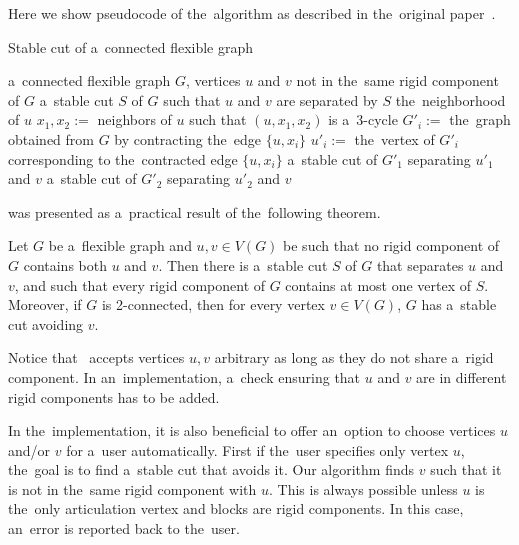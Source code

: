 Here we show pseudocode of the~algorithm as described
in the~original paper~\cite{stable_cuts_legersky}.
%
\begin{algorithm}[ht]
	\caption{Stable cut of a~connected flexible graph}%
	\label{alg:stable_cut_flexible}%
	\begin{algorithmic}[1]
		\Require{} a~connected flexible graph $G$, vertices $u$ and $v$ not in the~same rigid component of $G$
		\Ensure{} a~stable cut $S$ of $G$ such that $u$ and $v$ are separated by $S$
		\State\Return{} the~neighborhood of $u$
		\Else{}
		\State{} $x_1,x_2 :={}$ neighbors of $u$ such that $(u,x_1,x_2)$  is a~$3$-cycle
		\State{} $G'_i :={}$ the~graph obtained from $G$ by contracting the~edge $\{u, x_i\}$
		\State{} $u'_i :={}$ the~vertex of $G'_i$ corresponding to the~contracted edge $\{u, x_i\}$
		\EndFor{}
		\State\Return{} a~stable cut of $G'_1$ separating $u'_1$ and $v$
		\Else{}
		\State\Return{} a~stable cut of $G'_2$ separating $u'_2$ and $v$
		\EndIf{}
		\EndIf{}
	\end{algorithmic}
\end{algorithm}
%

was presented as a~practical result of the~following theorem.
%
\begin{theorem}
	Let \( G \) be a~flexible graph and \( u, v \in V (G) \) be such that no rigid component of \( G \)
	contains both \( u \) and \( v \). Then there is a~stable cut \( S \) of \( G \) that separates \( u \) and \( v \), and such that
	every rigid component of \( G \) contains at most one vertex of \( S \). Moreover, if \( G \) is 2-connected,
	then for every vertex \( v \in V(G) \), \( G \) has a~stable cut avoiding \( v \).
\end{theorem}
%

Notice that~
accepts vertices \( u, v \) arbitrary as long as they do not share a~rigid component.
In an~implementation, a~check ensuring that \( u \) and \( v \)
are in different rigid components has to be added.

In the~implementation, it is also beneficial to offer an~option to choose
vertices \( u \) and/or \(  v \) for a~user automatically.
First if the~user specifies only vertex \( u \), the~goal is to find a~stable cut
that avoids it. Our algorithm finds \( v \)
such that it is not in the~same rigid component with \( u \).
This is always possible unless \( u \) is the~only articulation vertex
and blocks are rigid components. In this case, an~error is reported back to the~user.


